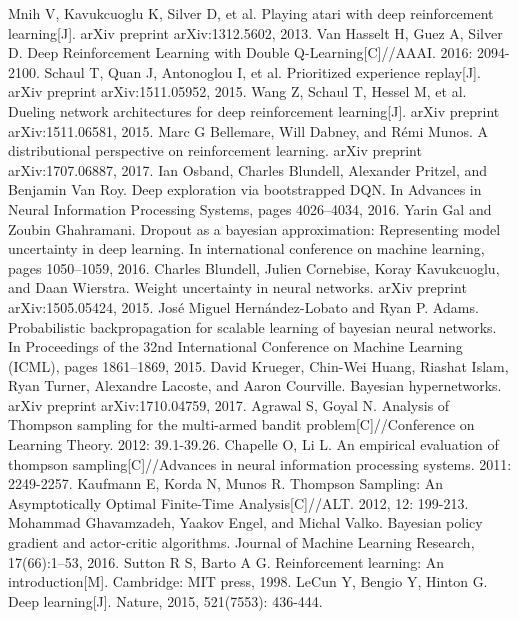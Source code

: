 \documentclass[a4paper,12pt]{article}
\begin{document}
\begin{thebibliography}{99}
	Mnih V, Kavukcuoglu K, Silver D, et al. Playing atari with deep reinforcement learning[J]. arXiv preprint arXiv:1312.5602, 2013.
	Van Hasselt H, Guez A, Silver D. Deep Reinforcement Learning with Double Q-Learning[C]//AAAI. 2016: 2094-2100.
	Schaul T, Quan J, Antonoglou I, et al. Prioritized experience replay[J]. arXiv preprint arXiv:1511.05952, 2015.
	Wang Z, Schaul T, Hessel M, et al. Dueling network architectures for deep reinforcement learning[J]. arXiv preprint arXiv:1511.06581, 2015.
	Marc G Bellemare, Will Dabney, and Rémi Munos. A distributional perspective on reinforcement learning. arXiv preprint arXiv:1707.06887, 2017.
	Ian Osband, Charles Blundell, Alexander Pritzel, and Benjamin Van Roy. Deep exploration via bootstrapped DQN. In Advances in Neural Information Processing Systems, pages 4026–4034, 2016.
	Yarin Gal and Zoubin Ghahramani. Dropout as a bayesian approximation: Representing model uncertainty in deep learning. In international conference on machine learning, pages 1050–1059, 2016.
	Charles Blundell, Julien Cornebise, Koray Kavukcuoglu, and Daan Wierstra. Weight uncertainty in neural networks. arXiv preprint arXiv:1505.05424, 2015.
	José Miguel Hernández-Lobato and Ryan P. Adams. Probabilistic backpropagation for scalable learning of bayesian neural networks. In Proceedings of the 32nd International Conference on Machine Learning (ICML), pages 1861–1869, 2015.
	David Krueger, Chin-Wei Huang, Riashat Islam, Ryan Turner, Alexandre Lacoste, and Aaron Courville. Bayesian hypernetworks. arXiv preprint arXiv:1710.04759, 2017.
	Agrawal S, Goyal N. Analysis of Thompson sampling for the multi-armed bandit problem[C]//Conference on Learning Theory. 2012: 39.1-39.26.
	Chapelle O, Li L. An empirical evaluation of thompson sampling[C]//Advances in neural information processing systems. 2011: 2249-2257.
	Kaufmann E, Korda N, Munos R. Thompson Sampling: An Asymptotically Optimal Finite-Time Analysis[C]//ALT. 2012, 12: 199-213.
	Mohammad Ghavamzadeh, Yaakov Engel, and Michal Valko. Bayesian policy gradient and actor-critic algorithms. Journal of Machine Learning Research, 17(66):1–53, 2016.
	Sutton R S, Barto A G. Reinforcement learning: An introduction[M]. Cambridge: MIT press, 1998.
	LeCun Y, Bengio Y, Hinton G. Deep learning[J]. Nature, 2015, 521(7553): 436-444.
\end{thebibliography}
\end{document}
